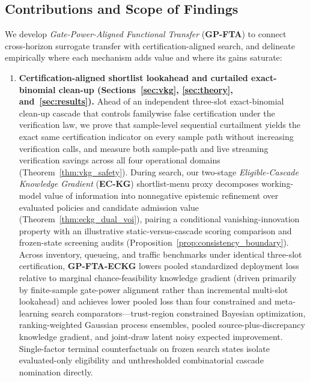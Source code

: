 \subsection{Contributions and Scope of Findings}

We develop \emph{Gate-Power-Aligned Functional Transfer} (\textbf{GP-FTA}) to connect cross-horizon surrogate transfer with certification-aligned search, and delineate empirically where each mechanism adds value and where its gains saturate:
\begin{enumerate}
  \item \textbf{Certification-aligned shortlist lookahead and curtailed exact-binomial clean-up (Sections~\ref{sec:vkg}, \ref{sec:theory}, and~\ref{sec:results}).} Ahead of an independent three-slot exact-binomial clean-up cascade that controls familywise false certification under the verification law, we prove that sample-level sequential curtailment yields the exact same certification indicator on every sample path without increasing verification calls, and measure both sample-path and live streaming verification savings across all four operational domains (Theorem~\ref{thm:vkg_safety}). During search, our two-stage \emph{Eligible-Cascade Knowledge Gradient} (\textbf{EC-KG}) shortlist-menu proxy decomposes working-model value of information into nonnegative epistemic refinement over evaluated policies and candidate admission value (Theorem~\ref{thm:eckg_dual_voi}), pairing a conditional vanishing-innovation property with an illustrative static-versus-cascade scoring comparison and frozen-state screening audits (Proposition~\ref{prop:consistency_boundary}). Across inventory, queueing, and traffic benchmarks under identical three-slot certification, \textbf{GP-FTA-ECKG} lowers pooled standardized deployment loss relative to marginal chance-feasibility knowledge gradient (driven primarily by finite-sample gate-power alignment rather than incremental multi-slot lookahead) and achieves lower pooled loss than four constrained and meta-learning search comparators—trust-region constrained Bayesian optimization, ranking-weighted Gaussian process ensembles, pooled source-plus-discrepancy knowledge gradient, and joint-draw latent noisy expected improvement. Single-factor terminal counterfactuals on frozen search states isolate evaluated-only eligibility and unthresholded combinatorial cascade nomination directly.

\end{enumerate}
